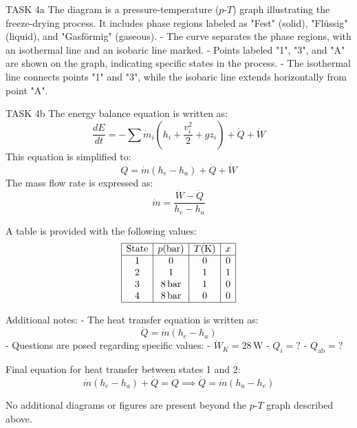 TASK 4a  
The diagram is a pressure-temperature (\( p \)-\( T \)) graph illustrating the freeze-drying process. It includes phase regions labeled as "Fest" (solid), "Flüssig" (liquid), and "Gasförmig" (gaseous).  
- The curve separates the phase regions, with an isothermal line and an isobaric line marked.  
- Points labeled "1", "3", and "A" are shown on the graph, indicating specific states in the process.  
- The isothermal line connects points "1" and "3", while the isobaric line extends horizontally from point "A".  

TASK 4b  
The energy balance equation is written as:  
\[
\frac{dE}{dt} = -\sum \dot{m}_i (h_i + \frac{v_i^2}{2} + g z_i) + \dot{Q} + \dot{W}
\]  
This equation is simplified to:  
\[
Q = \dot{m} (h_e - h_a) + \dot{Q} + \dot{W}
\]  
The mass flow rate is expressed as:  
\[
\dot{m} = \frac{\dot{W} - \dot{Q}}{h_e - h_a}
\]  

A table is provided with the following values:  
\[
\begin{array}{|c|c|c|c|}
\hline
\text{State} & p (\text{bar}) & T (\text{K}) & x \\
\hline
1 & 0 & 0 & 0 \\
2 & 1 & 1 & 1 \\
3 & 8 \, \text{bar} & 1 & 0 \\
4 & 8 \, \text{bar} & 0 & 0 \\
\hline
\end{array}
\]  

Additional notes:  
- The heat transfer equation is written as:  
\[
\dot{Q} = \dot{m} (h_e - h_a)
\]  
- Questions are posed regarding specific values:  
  - \( \dot{W}_K = 28 \, \text{W} \)  
  - \( Q_i = ? \)  
  - \( Q_{\text{ab}} = ? \)  

Final equation for heat transfer between states 1 and 2:  
\[
\dot{m} (h_e - h_a) + \dot{Q} = \dot{Q} \implies \dot{Q} = \dot{m} (h_a - h_e)
\]  

No additional diagrams or figures are present beyond the \( p \)-\( T \) graph described above.